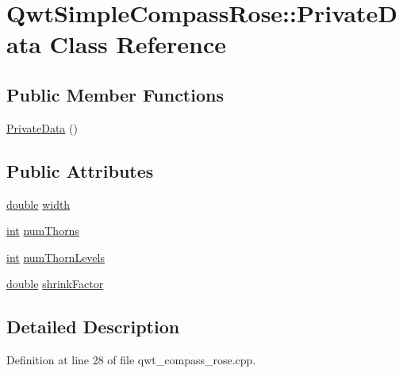 \hypertarget{class_qwt_simple_compass_rose_1_1_private_data}{\section{Qwt\-Simple\-Compass\-Rose\-:\-:Private\-Data Class Reference}
\label{class_qwt_simple_compass_rose_1_1_private_data}
}
\subsection*{Public Member Functions}
\begin{DoxyCompactItemize}
\item 
\hyperlink{class_qwt_simple_compass_rose_1_1_private_data_added9fe481451e7b96397c2d1ad8eb3e}{Private\-Data} ()
\end{DoxyCompactItemize}
\subsection*{Public Attributes}
\begin{DoxyCompactItemize}
\item 
\hyperlink{_super_l_u_support_8h_a8956b2b9f49bf918deed98379d159ca7}{double} \hyperlink{class_qwt_simple_compass_rose_1_1_private_data_ae8321c4088bf8fd76d5a47fba1131761}{width}
\item 
\hyperlink{ioapi_8h_a787fa3cf048117ba7123753c1e74fcd6}{int} \hyperlink{class_qwt_simple_compass_rose_1_1_private_data_a64d956b9422be4da9513f820c786a0ec}{num\-Thorns}
\item 
\hyperlink{ioapi_8h_a787fa3cf048117ba7123753c1e74fcd6}{int} \hyperlink{class_qwt_simple_compass_rose_1_1_private_data_a2c9284dc2c5b82f11eb1afd71c540967}{num\-Thorn\-Levels}
\item 
\hyperlink{_super_l_u_support_8h_a8956b2b9f49bf918deed98379d159ca7}{double} \hyperlink{class_qwt_simple_compass_rose_1_1_private_data_abf2ea42937a1c22ddcac53b384e88c69}{shrink\-Factor}
\end{DoxyCompactItemize}


\subsection{Detailed Description}


Definition at line 28 of file qwt\-\_\-compass\-\_\-rose.\-cpp.



